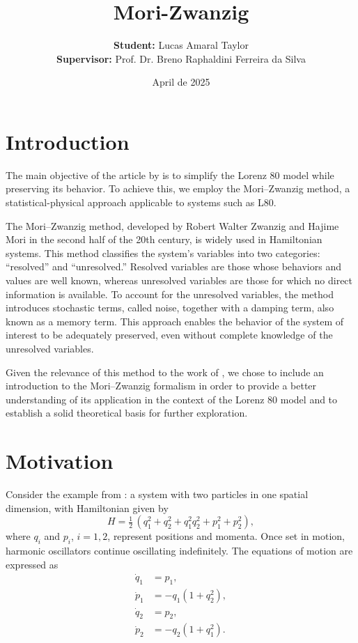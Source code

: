\documentclass[12pt]{article}
\title{Mori-Zwanzig}
\date{April de 2025}
\author{
    \textbf{Student:} Lucas Amaral Taylor\\
    \textbf{Supervisor:} Prof. Dr. Breno Raphaldini Ferreira da Silva
}
\begin{document}
\maketitle

\section{Introduction}
The main objective of the article by \citet{Chekroun2021} is to simplify the Lorenz 80 model while preserving its behavior. To achieve this, we employ the Mori–Zwanzig method, a statistical-physical approach applicable to systems such as L80.

The Mori–Zwanzig method, developed by Robert Walter Zwanzig and Hajime Mori in the second half of the 20th century, is widely used in Hamiltonian systems. This method classifies the system's variables into two categories: “resolved” and “unresolved.” Resolved variables are those whose behaviors and values are well known, whereas unresolved variables are those for which no direct information is available. To account for the unresolved variables, the method introduces stochastic terms, called noise, together with a damping term, also known as a memory term. This approach enables the behavior of the system of interest to be adequately preserved, even without complete knowledge of the unresolved variables.

Given the relevance of this method to the work of \citet{Chekroun2021}, we chose to include an introduction to the Mori–Zwanzig formalism in order to provide a better understanding of its application in the context of the Lorenz 80 model and to establish a solid theoretical basis for further exploration.
\newpage

\section{Motivation}
Consider the example from \citet[p.~173]{Chorin2013}: a system with two particles in one spatial dimension, with Hamiltonian given by
\begin{equation*}
	H = \tfrac{1}{2}\,(q_1^2 + q_2^2 + q_1^2 q_2^2 + p_1^2 + p_2^2),
\end{equation*}
where $q_i$ and $p_i$, $i = 1, 2$, represent positions and momenta. Once set in motion, harmonic oscillators continue oscillating indefinitely. The equations of motion are expressed as
\begin{align}
	\dot{q}_1 & = p_1, \nonumber             \\
	\dot{p}_1 & = -q_1(1 + q_2^2), \nonumber \\
	\dot{q}_2 & = p_2, \nonumber             \\
	\dot{p}_2 & = -q_2(1 + q_1^2).           
	\label{eq:harmonic-system}
\end{align}
\end{document}
